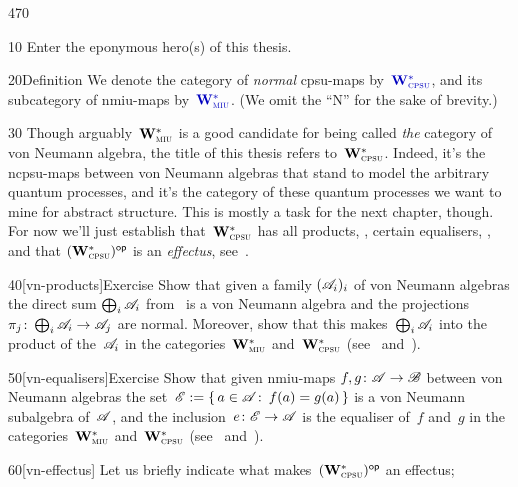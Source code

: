\begin{parsec}{470}%
\begin{point}{10}%
Enter the eponymous hero(s) of this thesis.
\end{point}
\begin{point}{20}{Definition}%
We denote 
the category of
\emph{normal} cpsu-maps
by~$\Define{\W{cpsu}}$,
and its subcategory of nmiu-maps
by~$\Define{\W{miu}}$.
%
(We omit the ``N'' for the sake of brevity.)
\begin{point}{30}%
Though arguably~$\mathbf{W}^*_{\text{\textsc{miu}}}$
is a good candidate
for being called \emph{the} category of von Neumann algebra,
the title of this thesis refers to~$\mathbf{W}^*_{\text{\textsc{cpsu}}}$.%
%
Indeed, it's the ncpsu-maps between von Neumann algebras
that stand to model the arbitrary quantum processes,
and it's the category of these quantum processes
we want to mine for abstract structure.
This is mostly a task for the next chapter,
though.
For now we'll just establish that~$\mathbf{W}^*_{\text{\textsc{cpsu}}}$
has all products, , certain equalisers,
,
and that ${(\mathbf{W}^*_{\text{\textsc{cpsu}}})}{^{\mathsf{op}}}$ is an \emph{effectus}, see~.
\end{point}
\end{point}
\begin{point}{40}[vn-products]{Exercise}%
Show that
given a family $(\mathscr{A}_i)_i$
of von Neumann algebras
the direct sum
$\bigoplus_i \mathscr{A}_i$
from~
is a von Neumann algebra
and  the projections
$\pi_j \colon \bigoplus_i \mathscr{A}_i\to\mathscr{A}_j$
are normal.
Moreover, show
that this makes~$\bigoplus_i \mathscr{A}_i$
into the  product of the~$\mathscr{A}_i$
in the categories~$\mathbf{W}^*_{\text{\textsc{miu}}}$ and~$\mathbf{W}^*_{\text{\textsc{cpsu}}}$
(see~ and~).
\end{point}
\begin{point}{50}[vn-equalisers]{Exercise}%
Show that given nmiu-maps $f,g\colon \mathscr{A}\to\mathscr{B}$
between von Neumann algebras
the set~$\mathscr{E}:=\{\,a\in\mathscr{A}\colon\, f(a)=g(a)\,\}$
is a von Neumann subalgebra of~$\mathscr{A}$,
and the inclusion~$e\colon \mathscr{E}\to\mathscr{A}$
is the equaliser of~$f$ and~$g$ in the 
categories~$\mathbf{W}^*_{\text{\textsc{miu}}}$ and~$\mathbf{W}^*_{\text{\textsc{cpsu}}}$
(see~ and~).
\end{point}
\begin{point}{60}[vn-effectus]
Let us briefly indicate what makes~${(\mathbf{W}^*_{\text{\textsc{cpsu}}})}{^{\mathsf{op}}}$ an effectus;

\end{point}
\end{parsec}
